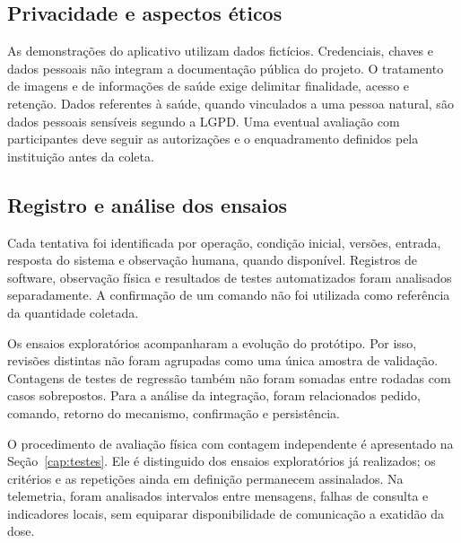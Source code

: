 \subsection{Privacidade e aspectos éticos}
As demonstrações do aplicativo utilizam dados fictícios.
Credenciais, chaves e dados pessoais não integram a documentação pública do projeto.
O tratamento de imagens e de informações de saúde exige delimitar finalidade, acesso e retenção. Dados referentes à saúde, quando vinculados a uma pessoa natural, são dados pessoais sensíveis segundo a LGPD. \cite{LGPD}
Uma eventual avaliação com participantes deve seguir as autorizações e o enquadramento definidos pela instituição antes da coleta.
\subsection{Registro e análise dos ensaios}
Cada tentativa foi identificada por operação, condição inicial, versões, entrada, resposta do sistema e observação humana, quando disponível. Registros de software, observação física e resultados de testes automatizados foram analisados separadamente. A confirmação de um comando não foi utilizada como referência da quantidade coletada.

Os ensaios exploratórios acompanharam a evolução do protótipo. Por isso, revisões distintas não foram agrupadas como uma única amostra de validação. Contagens de testes de regressão também não foram somadas entre rodadas com casos sobrepostos. Para a análise da integração, foram relacionados pedido, comando, retorno do mecanismo, confirmação e persistência.

O procedimento de avaliação física com contagem independente é apresentado na Seção~\ref{cap:testes}. Ele é distinguido dos ensaios exploratórios já realizados; os critérios e as repetições ainda em definição permanecem assinalados. Na telemetria, foram analisados intervalos entre mensagens, falhas de consulta e indicadores locais, sem equiparar disponibilidade de comunicação a exatidão da dose.

